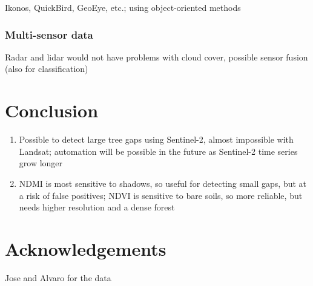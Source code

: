 \documentclass[a4paper,12pt]{scrbook}
\begin{document}
Ikonos, QuickBird, GeoEye, etc.; using object-oriented methods

\subsection{Multi-sensor data}

Radar and lidar would not have problems with cloud cover, possible sensor fusion (also for classification)

\chapter{Conclusion}

\begin{enumerate}
 \item Possible to detect large tree gaps using Sentinel-2, almost impossible with Landsat; automation will be possible in the future as Sentinel-2 time series grow longer
 \item \ac{NDMI} is most sensitive to shadows, so useful for detecting small gaps, but at a risk of false positives; \ac{NDVI} is sensitive to bare soils, so more reliable, but needs higher resolution and a dense forest
\end{enumerate}

\chapter{Acknowledgements}

Jose and Alvaro for the data

\printnoidxglossary[type=acronym]


\end{document}
